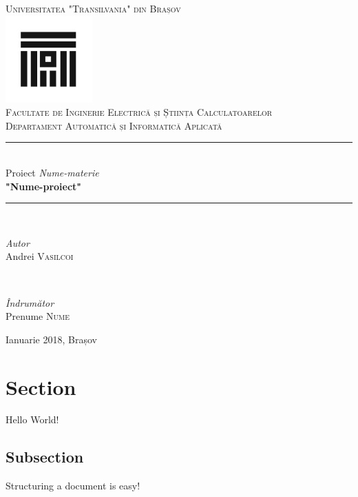 \documentclass{article}
\author{Andrei Vasilcoi}
\date{Ianuarie 2018}
\begin{document}
	
\begin{titlepage}

\newcommand{\HRule}{\rule{\linewidth}{0.5mm}}
	
\begin{center}
\textsc{\LARGE Universitatea "Transilvania" din Brașov}\\[0.5cm]
\includegraphics[width=0.25\textwidth]{logo_ut.jpg}\\[0.5cm]
\textsc{\Large Facultate de Inginerie Electrică și Știința Calculatoarelor}\\[0.5cm]
\textsc{\large Departament Automatică și Informatică Aplicată}\\[1.5cm]
\HRule\\[0.5cm]
{\Large Proiect \textit{Nume-materie}}\\[0.5cm]
{\LARGE\bfseries "Nume-proiect"}\\[0.5cm]
\HRule\\[1.5cm]
	
\begin{minipage}{0.4\textwidth}
	\begin{flushleft}
		\large
		\textit{Autor}\\
		Andrei \textsc{Vasilcoi}\\
	\end{flushleft}
\end{minipage}
~
\begin{minipage}{0.4\textwidth}
	\begin{flushright}
		\large
		\textit{Îndrumător}\\
		Prenume \textsc{Nume}
	\end{flushright}
\end{minipage}
\vfill
{\large Ianuarie 2018, Brașov}\\[1cm]
\end{center}
\end{titlepage}

\newpage
{}
\tableofcontents

\newpage	
\section{Section}

Hello World!

\subsection{Subsection}

Structuring a document is easy!\\
\end{document}
